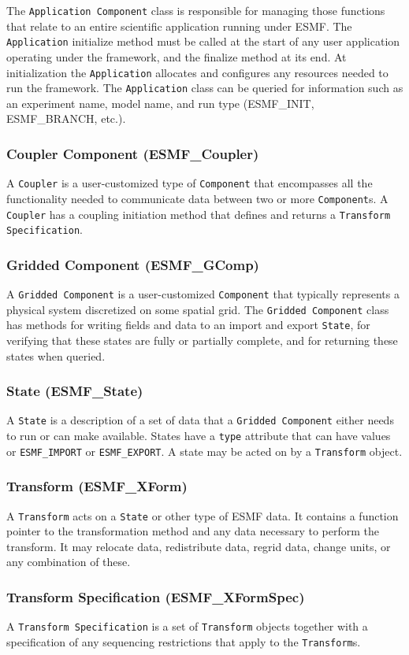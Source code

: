 The {\tt Application Component} class is responsible for managing those 
functions that relate to an entire scientific application running under ESMF.
The {\tt Application} initialize method 
must be called at the start of any user application operating under the framework, and
the finalize method at its end.  At initialization the {\tt Application} allocates and 
configures any resources needed to run the framework.  The {\tt Application}
class can be queried for information such as an experiment name, model name, and run 
type (ESMF\_INIT, ESMF\_BRANCH, etc.).  

\subsubsection{Coupler Component (ESMF\_Coupler)}
A {\tt Coupler} is a user-customized type of {\tt Component} that 
encompasses all the functionality needed to communicate data between two or 
more {\tt Component}s.  A {\tt Coupler} has a coupling initiation method that 
defines and returns a {\tt Transform Specification}.

\subsubsection{Gridded Component (ESMF\_GComp)}
\label{sec:griddedcomponent} 
A {\tt Gridded Component} is a user-customized {\tt Component} 
that typically represents a physical system discretized on some spatial grid.
The {\tt Gridded Component} class has methods for writing 
fields and data to an import and export {\tt State}, for verifying that
these states are fully or partially complete, and for returning these
states when queried.

\subsubsection{State (ESMF\_State)}
A {\tt State} is a description of a set of data that a 
{\tt Gridded Component} either needs to run or can make available.  States
have a {\tt type} attribute that can have values or {\tt ESMF\_IMPORT} or
{\tt ESMF\_EXPORT}.  A state may be acted on by a {\tt Transform} object.

\subsubsection{Transform (ESMF\_XForm)} 
A {\tt Transform} acts on a {\tt State} or other type of 
ESMF data.  It contains a function pointer to the transformation method 
and any data necessary to perform the transform.  It may relocate data, 
redistribute data, regrid data, change units, or any combination of these.  

\subsubsection{Transform Specification (ESMF\_XFormSpec)} 
A {\tt Transform Specification} is a set of {\tt Transform} objects
together with a specification of any sequencing restrictions that apply to 
the {\tt Transform}s.








